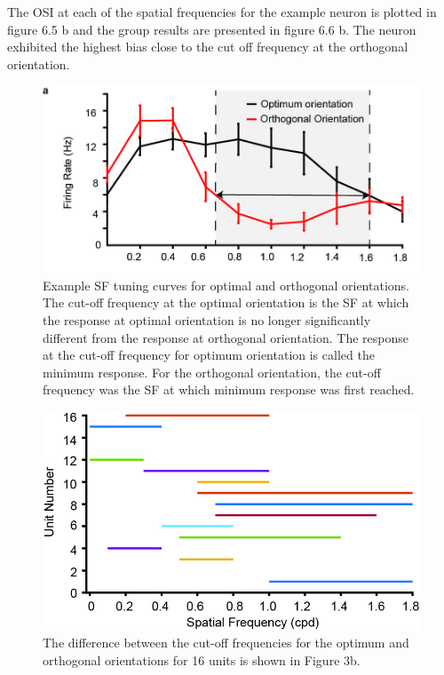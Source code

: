 \documentclass [12pt]{report}
\begin{document}
	The OSI at each of the spatial frequencies for the example neuron is plotted in figure 6.5 b and the group results are presented in figure 6.6 b.
	The neuron exhibited the highest bias close to the cut off frequency at the orthogonal orientation.

	\begin{figure}
		\includegraphics[width=\linewidth]{SCOptOrth.jpg}
		\caption{Example SF tuning curves for optimal and orthogonal orientations. The cut-off frequency at the
			optimal orientation is the SF at which the response at optimal orientation is no longer significantly different from the response at orthogonal
			orientation. The response at the cut-off frequency for optimum orientation is called the minimum response. For the orthogonal orientation, the
			cut-off frequency was the SF at which minimum response was first reached.}
		\label{fig:fig5}			
	\end{figure}
	
	\begin{figure}
		\includegraphics[width=\linewidth]{SCSFTuning.jpg}
		\caption{ The difference between the cut-off frequencies for the optimum
			and orthogonal orientations for 16 units is shown in Figure 3b.}
		\label{fig:fig6}			
	\end{figure}
	
\end{document}
